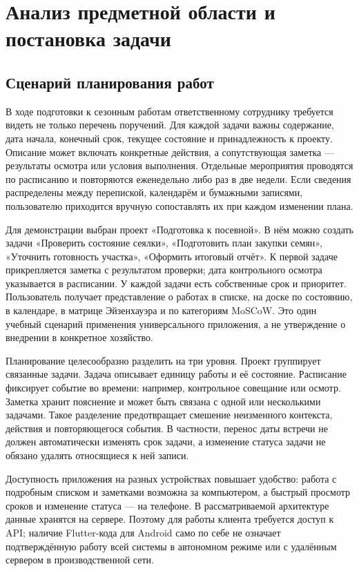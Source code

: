 \documentclass[14pt,a4paper]{extarticle}
\begin{document}
\section{Анализ предметной области и постановка задачи}

\subsection{Сценарий планирования работ}

В ходе подготовки к сезонным работам ответственному сотруднику требуется видеть не только перечень поручений. Для каждой задачи важны содержание, дата начала, конечный срок, текущее состояние и принадлежность к проекту. Описание может включать конкретные действия, а сопутствующая заметка --- результаты осмотра или условия выполнения. Отдельные мероприятия проводятся по расписанию и повторяются еженедельно либо раз в две недели. Если сведения распределены между перепиской, календарём и бумажными записями, пользователю приходится вручную сопоставлять их при каждом изменении плана.

Для демонстрации выбран проект «Подготовка к посевной». В нём можно создать задачи «Проверить состояние сеялки», «Подготовить план закупки семян», «Уточнить готовность участка», «Оформить итоговый отчёт». К первой задаче прикрепляется заметка с результатом проверки; дата контрольного осмотра указывается в расписании. У каждой задачи есть собственные срок и приоритет. Пользователь получает представление о работах в списке, на доске по состоянию, в календаре, в матрице Эйзенхауэра и по категориям MoSCoW. Это один учебный сценарий применения универсального приложения, а не утверждение о внедрении в конкретное хозяйство.

Планирование целесообразно разделить на три уровня. Проект группирует связанные задачи. Задача описывает единицу работы и её состояние. Расписание фиксирует событие во времени: например, контрольное совещание или осмотр. Заметка хранит пояснение и может быть связана с одной или несколькими задачами. Такое разделение предотвращает смешение неизменного контекста, действия и повторяющегося события. В частности, перенос даты встречи не должен автоматически изменять срок задачи, а изменение статуса задачи не обязано удалять относящиеся к ней записи.

Доступность приложения на разных устройствах повышает удобство: работа с подробным списком и заметками возможна за компьютером, а быстрый просмотр сроков и изменение статуса --- на телефоне. В рассматриваемой архитектуре данные хранятся на сервере. Поэтому для работы клиента требуется доступ к API; наличие Flutter-кода для Android само по себе не означает подтверждённую работу всей системы в автономном режиме или с удалённым сервером в производственной сети.
\end{document}
